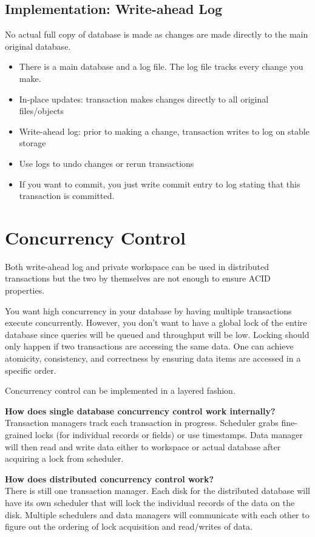 \documentclass[twoside]{article}
\begin{document}
\subsection{Implementation: Write-ahead Log}

No actual full copy of database is made as changes are made directly to the main original database.
\begin{itemize}
\item{There is a main database and a log file. The log file tracks every change you make.}
\item{In-place updates: transaction makes changes directly to all original files/objects}
\item{Write-ahead log: prior to making a change, transaction writes to log on stable storage}
\item{Use logs to undo changes or rerun transactions}
\item{If you want to commit, you just write commit entry to log stating that this transaction is committed.}
\end{itemize}



\section{Concurrency Control}

Both write-ahead log and private workspace can be used in distributed transactions but the two by themselves are not enough to ensure ACID properties.

You want high concurrency in your database by having multiple transactions execute concurrently. However, you don't want to have a global lock of the entire database since queries will be queued and throughput will be low. Locking should only happen if two transactions are accessing the same data. One can achieve atomicity, consistency, and correctness by ensuring data items are accessed in a specific order.

Concurrency control can be implemented in a layered fashion.

\textbf{How does single database concurrency control work internally?}\\
Transaction managers track each transaction in progress. Scheduler grabs fine-grained locks (for individual records or fields) or use timestamps. Data manager will then read and write data either to workspace or actual database after acquiring a lock from scheduler.

\textbf{How does distributed concurrency control work?}\\
There is still one transaction manager. Each disk for the distributed database will have its own scheduler that will lock the individual records of the data on the disk. Multiple schedulers and data managers will communicate with each other to figure out the ordering of lock acquisition and read/writes of data.
\end{document}
